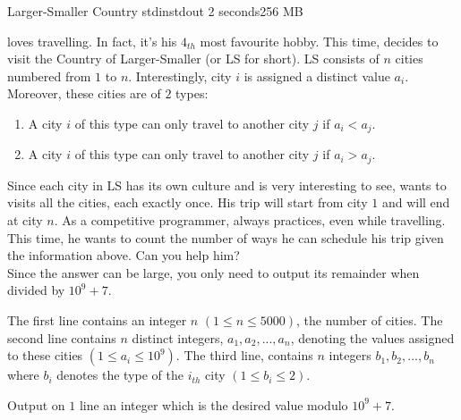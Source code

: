 \begin{problem}{Larger-Smaller Country}
{stdin}{stdout}
{2 seconds}{256 MB}{}

\TiChuot loves travelling. In fact, it's his $4_{th}$ most favourite hobby. This time, \TiChuot decides to visit the Country of Larger-Smaller (or
LS for short). LS consists of $n$ cities numbered from $1$ to $n$. Interestingly, city $i$ is assigned a distinct value $a_i$. Moreover, these cities
are of $2$ types:
    \begin{enumerate}
        \item
        A city $i$ of this type can only travel to another city $j$ if $a_i < a_j$.
        \item
        A city $i$ of this type can only travel to another city $j$ if $a_i > a_j$.
    \end{enumerate}
Since each city in LS has its own culture and is very interesting to see, \TiChuot wants to visits all the cities, each exactly once. His trip will
start from city $1$ and will end at city $n$. As a competitive programmer, \TiChuot always practices, even while travelling. This time, he wants to
count the number of ways he can schedule his trip given the information above. Can you help him?\\

Since the answer can be large, you only need to output its remainder when divided by $10^9 + 7$.

\InputFile
The first line contains an integer $n$ $(1 \leq n \leq 5000)$, the number of cities. The second line contains $n$ distinct integers, $a_1, a_2, ...,
a_n$, denoting the values assigned to these cities $(1 \leq a_i \leq 10^9)$. The third line, contains $n$ integers $b_1, b_2, ..., b_n$ where
$b_i$ denotes the type of the $i_{th}$ city $(1 \leq b_i \leq 2)$.

\OutputFile

Output on $1$ line an integer which is the desired value modulo $10^9 + 7$.

\Examples

\begin{example}
%
\end{example}

\end{problem}
